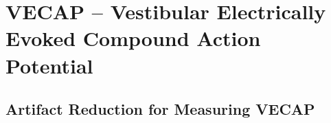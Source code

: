 \part{VECAP -- Vestibular Electrically Evoked Compound Action Potential}\label{part:vecap}

\chapter{Artifact Reduction for Measuring VECAP}

